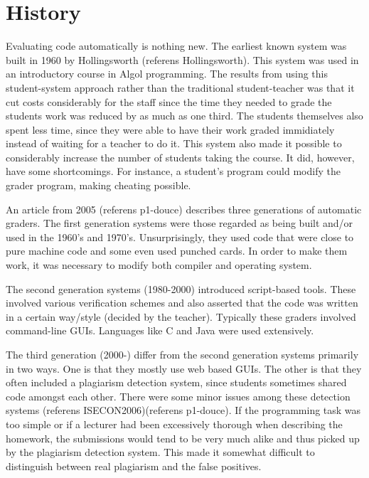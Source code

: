 \section{History}
Evaluating code automatically is nothing new. The earliest known system was built in 1960 by Hollingsworth (referens Hollingsworth). This system was used in an introductory course in Algol programming. The results from using this student-system approach rather than the traditional student-teacher was that it cut costs considerably for the staff since the time they needed to grade the students work was reduced by as much as one third. The students themselves also spent less time, since they were able to have their work graded immidiately instead of waiting for a teacher to do it. This system also made it possible to considerably increase the number of students taking the course. It did, however, have some shortcomings. For instance, a student's program could modify the grader program, making cheating possible. 

An article from 2005 (referens p1-douce) describes three generations of automatic graders. The first generation systems were those regarded as being built and/or used in the 1960's and 1970's. Unsurprisingly, they used code that were close to pure machine code and some even used punched cards. In order to make them work, it was necessary to modify both compiler and operating system. 

The second generation systems (1980-2000) introduced script-based tools. These involved various verification schemes and also asserted that the code was written in a certain way/style (decided by the teacher). Typically these graders involved command-line GUIs. Languages like C and Java were used extensively.

The third generation (2000-) differ from the second generation systems primarily in two ways. One is that they mostly use web based GUIs. The other is that they often included a plagiarism detection system, since students sometimes shared code amongst each other. There were some minor issues among these detection systems (referens ISECON2006)(referens p1-douce). If the programming task was too simple or if a lecturer had been excessively thorough when describing the homework, the submissions would tend to be very much alike and thus picked up by the plagiarism detection system. This made it somewhat difficult to distinguish between real plagiarism and the false positives. 